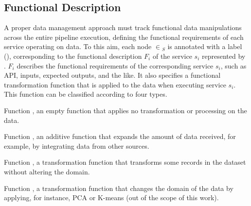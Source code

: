 \subsection{Functional Description}\label{sec:funcannotation}
A proper data management approach must track functional data manipulations across the entire pipeline execution, defining the functional requirements of each service operating on data. To this aim, each node $\in$\V$_S$ is annotated with a label \myGamma(), corresponding to the functional description $F_i$ of the service $s_i$ represented by . $F_i$ describes the functional requirements of the corresponding service $s_i$, such as API, inputs, expected outputs, and the like. 
It also specifies a functional transformation function  that is applied to the data when executing service $s_i$. This function can be classified according to four types.
        \begin{enumerate*}[label=\roman*)]
          \item Function \TF{\epsilon}, an empty function that applies no transformation or processing on the data.
          \item Function , an additive function that expands the amount of data received, for example, by integrating data from other sources.
          \item Function , a transformation function that transforms some records in the dataset without altering the domain.
          \item Function , a transformation function that changes the domain of the data by applying, for instance, PCA or K-means (out of the scope of this work).
        \end{enumerate*}

